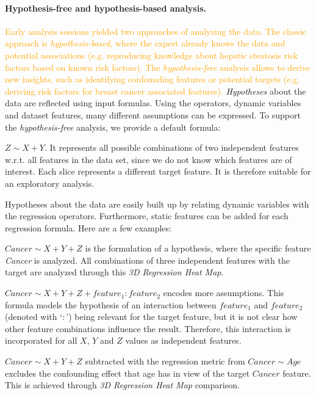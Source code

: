 \documentclass[journal]{style/vgtc} 			          %
\newcommand{\design}[1]{\textcolor{orange}{#1}}
\begin{document}
\paragraph{Hypothesis-free and hypothesis-based analysis.}
\design{
Early analysis sessions yielded two approaches of analyzing the data.
The classic approach is \emph{hypothesis-based}, where the expert already knows the data and potential associations (e.g. reproducing knowledge about hepatic steatosis risk factors based on known risk factors).
The \emph{hypothesis-free} analysis allows to derive new insights, such as identifying confounding features or potential targets (e.g. deriving risk factors for breast cancer associated features).
}
\emph{Hypotheses} about the data are reflected using input formulas.
Using the operators, dynamic variables and dataset features, many different assumptions can be expressed.
To support the \emph{hypothesis-free} analysis, we provide a default formula:

$Z \sim X + Y$.
It represents all possible combinations of two independent features w.r.t. all features in the data set, since we do not know which features are of interest.
Each slice represents a different target feature.
It is therefore suitable for an exploratory analysis.

Hypotheses about the data are easily built up by relating dynamic variables with the regression operators.
Furthermore, static features can be added for each regression formula.
Here are a few examples:

$Cancer \sim X + Y + Z$ is the formulation of a hypothesis, where the specific feature \textit{Cancer} is analyzed.
All combinations of three independent features with the target are analyzed through this \emph{3D Regression Heat Map}.

$Cancer \sim X + Y + Z + feature_1:feature_2$ encodes more assumptions.
This formula models the hypothesis of an interaction between $feature_1$ and $feature_2$ (denoted with `$:$') being relevant for the target feature, but it is not clear how other feature combinations influence the result.
Therefore, this interaction is incorporated for all $X$, $Y$ and $Z$ values as independent features.

$Cancer \sim X + Y + Z$ subtracted with the regression metric from $Cancer \sim Age$ excludes the confounding effect that age has in view of the target $Cancer$ feature.
This is achieved through \emph{3D Regression Heat Map} comparison.
\end{document}
